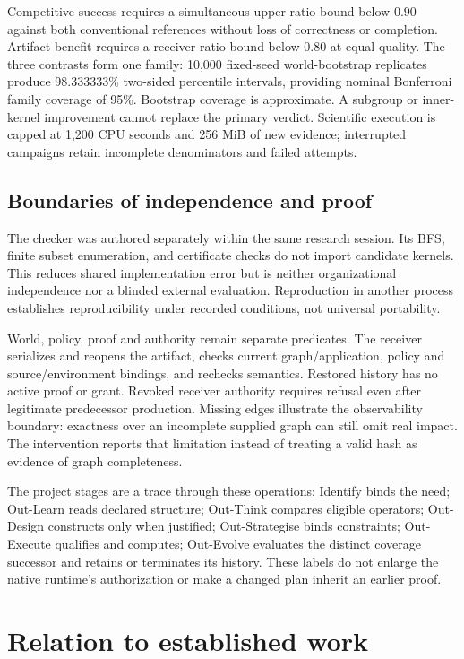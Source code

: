 Competitive success requires a simultaneous upper ratio bound below $0.90$ against both conventional references without loss of correctness or completion. Artifact benefit requires a receiver ratio bound below $0.80$ at equal quality. The three contrasts form one family: 10,000 fixed-seed world-bootstrap replicates~\cite{efron1979bootstrap} produce 98.333333\% two-sided percentile intervals, providing nominal Bonferroni family coverage of 95\%. Bootstrap coverage is approximate. A subgroup or inner-kernel improvement cannot replace the primary verdict. Scientific execution is capped at 1,200 CPU seconds and 256 MiB of new evidence; interrupted campaigns retain incomplete denominators and failed attempts.

\subsection{Boundaries of independence and proof}

The checker was authored separately within the same research session. Its BFS, finite subset enumeration, and certificate checks do not import candidate kernels. This reduces shared implementation error but is neither organizational independence nor a blinded external evaluation. Reproduction in another process establishes reproducibility under recorded conditions, not universal portability.

World, policy, proof and authority remain separate predicates. The receiver serializes and reopens the artifact, checks current graph/application, policy and source/environment bindings, and rechecks semantics. Restored history has no active proof or grant. Revoked receiver authority requires refusal even after legitimate predecessor production. Missing edges illustrate the observability boundary: exactness over an incomplete supplied graph can still omit real impact. The intervention reports that limitation instead of treating a valid hash as evidence of graph completeness.

The project stages are a trace through these operations: Identify binds the need; Out-Learn reads declared structure; Out-Think compares eligible operators; Out-Design constructs only when justified; Out-Strategise binds constraints; Out-Execute qualifies and computes; Out-Evolve evaluates the distinct coverage successor and retains or terminates its history. These labels do not enlarge the native runtime's authorization or make a changed plan inherit an earlier proof.

\section{Relation to established work}
\label{sec:bloom-related}

